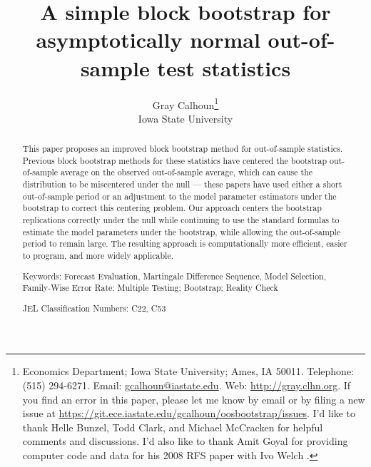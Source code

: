 \documentclass[12pt,fleqn]{article}
\begin{document}
\author{Gray Calhoun\thanks{ Economics Department; Iowa State
    University; Ames, IA 50011.  Telephone: (515) 294-6271.  Email:
    \guillemotleft\protect\url{gcalhoun@iastate.edu}\guillemotright.  Web:
    \guillemotleft\protect\url{http://gray.clhn.org}\guillemotright.
    If you find an error in this paper, please let me know by email or
    by filing a new issue at
    \guillemotleft\protect\url{https://git.ece.iastate.edu/gcalhoun/oosbootstrap/issues}\guillemotright.
    I'd like to thank Helle Bunzel, Todd Clark, and Michael McCracken
    for helpful comments and discussions.  I'd also like to thank Amit
    Goyal for providing computer code and data for his 2008
    RFS paper with Ivo
    Welch \citep{GoW:08}.} \\
  Iowa State University}

\title{A simple block bootstrap for asymptotically normal
  out-of-sample test statistics}

\maketitle

\begin{abstract} \noindent%
  This paper proposes an improved block bootstrap method for
  out-of-sample statistics. Previous block bootstrap methods for these
  statistics have centered the bootstrap out-of-sample average on the
  observed out-of-sample average, which can cause the distribution to
  be miscentered under the null --- these papers have used either a
  short out-of-sample period or an adjustment to the model parameter
  estimators under the bootstrap to correct this centering
  problem. Our approach centers the bootstrap replications correctly
  under the null while continuing to use the standard formulas to
  estimate the model parameters under the bootstrap, while allowing
  the out-of-sample period to remain large. The resulting approach is
  computationally more efficient, easier to program, and more widely
  applicable.

\strut

\noindent Keywords: Forecast Evaluation, Martingale Difference
Sequence, Model Selection, Family-Wise Error Rate; Multiple Testing;
Bootstrap; Reality Check

\strut

\noindent JEL Classification Numbers: C22, C53

\end{abstract}

\newpage
\end{document}
